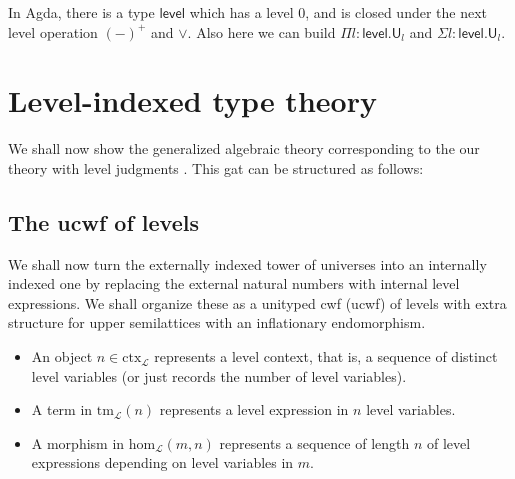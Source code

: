 \documentclass[11pt,a4paper]{article}
\theoremstyle{definition}
\newcommand{\Level}{\mathsf{level}}
\newcommand{\Ctx}{\mathrm{Ctx}}
\newcommand{\Tm}{\mathrm{Tm}}
\def\Ctx{\mathrm{ctx}}
\def\Tm{\mathrm{tm}}
\def\Hom{\mathrm{hom}}
\def\U{\mathsf{U}}
\def\L{{\mathcal{L}}}
\begin{document}
In Agda, there is a type $\Level$ which has a level 0, and is closed under the next level operation $(-)^+$ and $\vee$. Also here we can build $\Pi l : \Level.\U_l$ and $\Sigma l : \Level.\U_l$.

\section{Level-indexed type theory}

We shall now show the generalized algebraic theory corresponding to the our theory with level judgments \cite{bezem:}.
This gat can be structured as follows:

\subsection{The ucwf of levels}
We shall now turn the externally indexed tower of universes into an internally indexed one by replacing the external natural numbers with internal level expressions. We shall organize these as a unityped cwf (ucwf) of levels  with extra structure for upper semilattices with an inflationary endomorphism. 
\begin{itemize}
\item 
An object $n \in \Ctx_\L$ represents a level context, that is, a sequence of distinct level variables (or just records the number of level variables). 
\item
A term in $\Tm_\L(n)$ represents a level expression in $n$ level variables.
\item
A morphism in $\Hom_\L(m,n)$ represents a sequence of length $n$ of level expressions depending on level variables in $m$.
\end{itemize}
\end{document}
